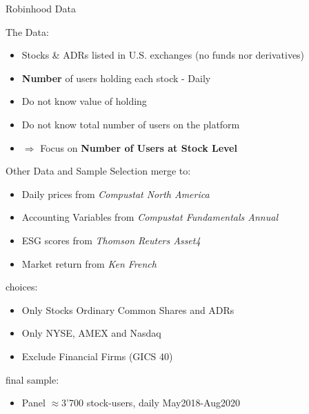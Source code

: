 \documentclass[10pt]{beamer}
\begin{document}
\begin{frame}{Robinhood Data}
 \pause

 { The Data:
\begin{itemize}
\item Stocks \& ADRs listed in U.S. exchanges (no funds nor derivatives) \pause
\item \textbf<3-5>{Number} of users holding each stock - Daily \pause
\item Do not know value of holding \pause
\item Do not know total number of users on the platform \pause
\item $\Rightarrow$ Focus on \textbf{Number of Users at Stock Level} 
\end{itemize} }
\pause
{}

\pause

\end{frame}

\begin{frame}{Other Data and Sample Selection}
merge to:
\begin{itemize}
\item Daily prices from \textit{Compustat North America} 
\item Accounting Variables from \textit{Compustat Fundamentals Annual }
\item ESG scores from \textit{Thomson Reuters Asset4}
\item Market return from \textit{Ken French}
\end{itemize}
\pause \vspace{5mm}
choices:
\begin{itemize}
\item Only Stocks Ordinary Common Shares and ADRs 
\item Only NYSE, AMEX and Nasdaq
\item Exclude Financial Firms (GICS 40)
\end{itemize}
\pause \vspace{5mm}
final sample:
\begin{itemize}
\item Panel $\approx$3'700 stock-users, daily May2018-Aug2020
\end{itemize}

\end{frame}
\end{document}

